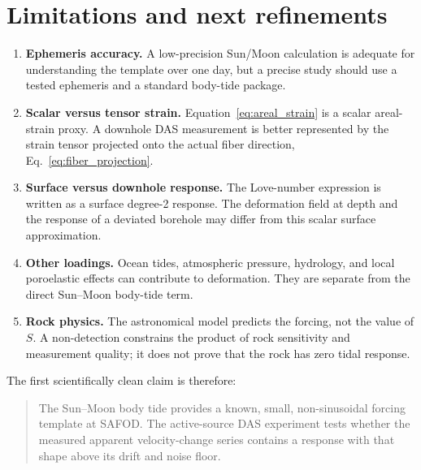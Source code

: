 \documentclass[11pt]{article}
\begin{document}
\section{Limitations and next refinements}

\begin{enumerate}
  \item \textbf{Ephemeris accuracy.} A low-precision Sun/Moon calculation is
        adequate for understanding the template over one day, but a precise
        study should use a tested ephemeris and a standard body-tide package.

  \item \textbf{Scalar versus tensor strain.} Equation~\eqref{eq:areal_strain}
        is a scalar areal-strain proxy.  A downhole DAS measurement is better
        represented by the strain tensor projected onto the actual fiber
        direction, Eq.~\eqref{eq:fiber_projection}.

  \item \textbf{Surface versus downhole response.} The Love-number expression
        is written as a surface degree-2 response.  The deformation field at
        depth and the response of a deviated borehole may differ from this
        scalar surface approximation.

  \item \textbf{Other loadings.} Ocean tides, atmospheric pressure, hydrology,
        and local poroelastic effects can contribute to deformation.  They are
        separate from the direct Sun--Moon body-tide term.

  \item \textbf{Rock physics.} The astronomical model predicts the forcing,
        not the value of $S$.  A non-detection constrains the product of rock
        sensitivity and measurement quality; it does not prove that the rock
        has zero tidal response.
\end{enumerate}

The first scientifically clean claim is therefore:

\begin{quote}
The Sun--Moon body tide provides a known, small, non-sinusoidal forcing
template at SAFOD.  The active-source DAS experiment tests whether the
measured apparent velocity-change series contains a response with that shape
above its drift and noise floor.
\end{quote}

\end{document}
